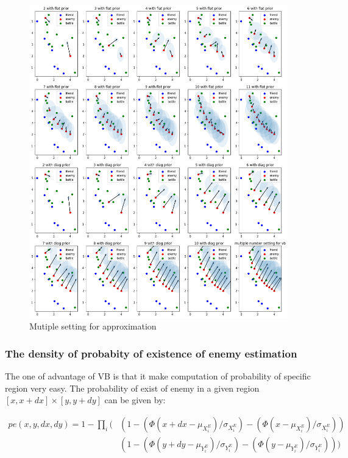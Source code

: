 \documentclass{article}
\begin{document}
\begin{figure}[h]
\includegraphics[width=0.99\linewidth]{big_vb.png}
\caption{Mutiple setting for approximation}
\label{fig:bigVb}
\end{figure}

\subsubsection{The density of probabity of existence of enemy estimation}

The one of advantage of VB is that it make computation of probability of specific region very easy.
The probability of exist of enemy in a given region $[x,x+dx]\times[y,y+dy]$ can be given by:

\begin{align*}
pe(x,y,dx,dy) = 1 - \prod_i (
& (1-(\Phi(x+dx - \mu_{X^E_i})/\sigma_{X^E_i}) -  (\Phi(x - \mu_{X^E_i})/\sigma_{X^E_i})) \\
& (1-(\Phi(y+dy - \mu_{Y^E_i})/\sigma_{Y^E_i}) -  (\Phi(y - \mu_{Y^E_i})/\sigma_{Y^E_i}))
)
\end{align*}
\end{document}

